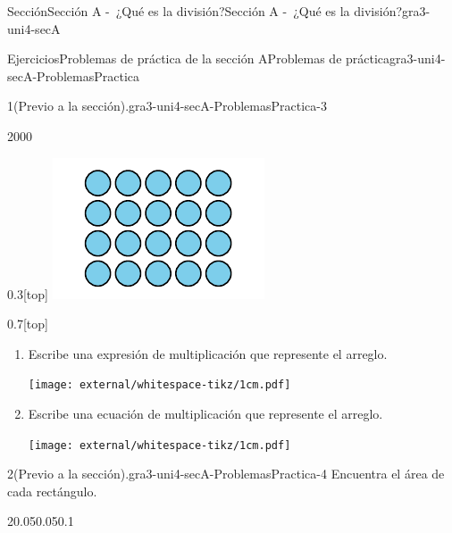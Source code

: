 \begin{sectionptx}{Sección}{Sección A -~¿Qué es la división?}{}{Sección A -~¿Qué es la división?}{}{}{gra3-uni4-secA}
\typeout{************************************************}
%
\begin{exercises-subsection}{Ejercicios}{Problemas de práctica de la sección A}{}{Problemas de práctica}{}{}{gra3-uni4-secA-ProblemasPractica}
\begin{divisionexercise}{1}{(Previo a la sección).}{}{gra3-uni4-secA-ProblemasPractica-3}%
\begin{sidebyside}{2}{0}{0}{0}%
\begin{sbspanel}{0.3}[top]%
\includegraphics[max width=\linewidth, center]{external/svg-source/tikz-file-151668.pdf}
\end{sbspanel}%
\begin{sbspanel}{0.7}[top]%
%
\begin{enumerate}[label={(\alph*)}]
\item{}Escribe una expresión de multiplicación que represente el arreglo.%
\par
\texttt{[image: external/whitespace-tikz/1cm.pdf]}
\item{}Escribe una ecuación de multiplicación que represente el arreglo.%
\par
\texttt{[image: external/whitespace-tikz/1cm.pdf]}
\end{enumerate}
%
\end{sbspanel}%
\end{sidebyside}%
\end{divisionexercise}%
\begin{divisionexercise}{2}{(Previo a la sección).}{}{gra3-uni4-secA-ProblemasPractica-4}%
Encuentra el área de cada rectángulo.%
\begin{sidebyside}{2}{0.05}{0.05}{0.1}%

\end{sidebyside}
\end{divisionexercise}
\end{exercises-subsection}
\end{sectionptx}
